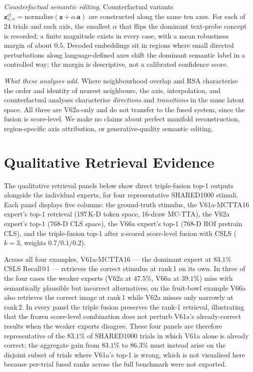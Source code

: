 \emph{Counterfactual semantic editing.} Counterfactual variants $\mathbf{z}^{\text{cf}}_{a,\alpha} = \mathrm{normalize}(\mathbf{z} + \alpha\,\mathbf{a})$ are constructed along the same ten axes. For each of $24$ trials and each axis, the smallest $\alpha$ that flips the dominant text-probe concept is recorded; a finite magnitude exists in every case, with a mean robustness margin of about $0.5$. Decoded embeddings sit in regions where small directed perturbations along language-defined axes shift the dominant semantic label in a controlled way; the margin is descriptive, not a calibrated confidence score.

\emph{What these analyses add.} Where neighbourhood overlap and RSA characterise the order and identity of nearest neighbours, the axis, interpolation, and counterfactual analyses characterise \emph{directions} and \emph{transitions} in the same latent space. All three are V62a-only and do not transfer to the fused system, since the fusion is score-level. We make no claims about perfect manifold reconstruction, region-specific axis attribution, or generative-quality semantic editing.

\section{Qualitative Retrieval Evidence}

The qualitative retrieval panels below show direct triple-fusion top-1 outputs alongside the individual experts, for four representative SHARED1000 stimuli. Each panel displays five columns: the ground-truth stimulus, the V61a-MCTTA16 expert's top-1 retrieval (197\,K-D token space, 16-draw MC-TTA), the V62a expert's top-1 (768-D CLS space), the V66a expert's top-1 (768-D ROI pretrain CLS), and the triple-fusion top-1 after z-scored score-level fusion with CSLS ($k{=}3$, weights $0.7 / 0.1 / 0.2$).

Across all four examples, V61a-MCTTA16 --- the dominant expert at $83.1\%$ CSLS Recall@1 --- retrieves the correct stimulus at rank\,1 on its own. In three of the four cases the weaker experts (V62a at $47.5\%$, V66a at $39.1\%$) miss with semantically plausible but incorrect alternatives; on the fruit-bowl example V66a also retrieves the correct image at rank\,1 while V62a misses only narrowly at rank\,2. In every panel the triple fusion preserves the rank-1 retrieval, illustrating that the frozen score-level combination does not perturb V61a's already-correct results when the weaker experts disagree. These four panels are therefore representative of the $83.1\%$ of SHARED1000 trials in which V61a alone is already correct; the aggregate gain from $83.1\%$ to $86.3\%$ must instead arise on the disjoint subset of trials where V61a's top-1 is wrong, which is not visualised here because per-trial fused ranks across the full benchmark were not exported.

